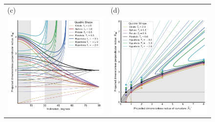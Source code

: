 \begin{figure}
\begin{tabular}{@{}ll@{}}
    (c) & (d) \\
    \includegraphics{figs/projected-R90-vs-i}
    & \includegraphics{figs/projected-R90-vs-Rc}
  \end{tabular}

\end{figure}
